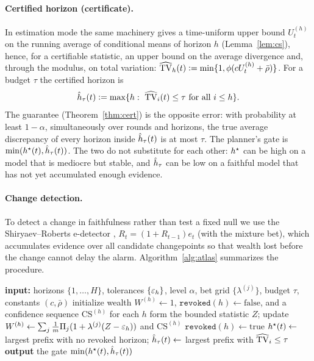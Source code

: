 \paragraph{Certified horizon (certificate).} In estimation mode the same machinery gives a
time-uniform upper bound $U^{(h)}_t$ on the running average of conditional means of horizon $h$ (Lemma~\ref{lem:cs}),
hence, for a certifiable statistic, an upper bound on the average divergence and, through the modulus, on total
variation: $\widehat{\mathrm{TV}}_h(t)\vcentcolon=\min\{1,\phi(cU^{(h)}_t+\bar\rho)\}$. For a budget $\tau$ the certified horizon is
\begin{equation}\label{eq:hcert}
\hat h_\tau(t)\vcentcolon=\max\{h:\ \widehat{\mathrm{TV}}_i(t)\le\tau\ \text{for all }i\le h\}.
\end{equation}
The guarantee (Theorem~\ref{thm:cert}) is the opposite error: with probability at least $1-\alpha$, simultaneously
over rounds and horizons, the true average discrepancy of every horizon inside $\hat h_\tau(t)$ is at most $\tau$.
The planner's gate is $\min(h^{\star}(t),\hat h_\tau(t))$. The two do not substitute for each other: $h^{\star}$ can
be high on a model that is mediocre but stable, and $\hat h_\tau$ can be low on a faithful model that has not yet
accumulated enough evidence.

\paragraph{Change detection.} To detect a change in faithfulness rather than test a fixed null we use the
Shiryaev--Roberts e-detector \citep{shin2024edetectors}, $R_t=(1+R_{t-1})e_t$ (with the mixture bet), which accumulates
evidence over all candidate changepoints so that wealth lost before the change cannot delay the alarm. Algorithm~\ref{alg:atlas} summarizes the procedure.

\begin{algorithm}[t]
\caption{ATLAS: monitoring and certification of a deployed world model}\label{alg:atlas}
\begin{algorithmic}[1]
\State \textbf{input:} horizons $\{1,\dots,H\}$, tolerances $\{\varepsilon_h\}$, level $\alpha$, bet grid $\{\lambda^{(j)}\}$, budget $\tau$, constants $(c,\bar\rho)$
\State initialize wealth $W^{(h)}\gets1$, $\texttt{revoked}(h)\gets\text{false}$, and a confidence sequence $\mathrm{CS}^{(h)}$ for each $h$
    \State form the bounded statistic $Z$; update $W^{(h)}\gets\sum_j\tfrac1m\Pi_j(1+\lambda^{(j)}(Z-\varepsilon_h))$ and $\mathrm{CS}^{(h)}$
     \State $\texttt{revoked}(h)\gets\text{true}$ \EndIf
  \EndFor
  \State $h^{\star}(t)\gets$ largest prefix with no revoked horizon; $\hat h_\tau(t)\gets$ largest prefix with $\widehat{\mathrm{TV}}_i\le\tau$
  \State \textbf{output} the gate $\min(h^{\star}(t),\hat h_\tau(t))$
\EndFor
\end{algorithmic}
\end{algorithm}

